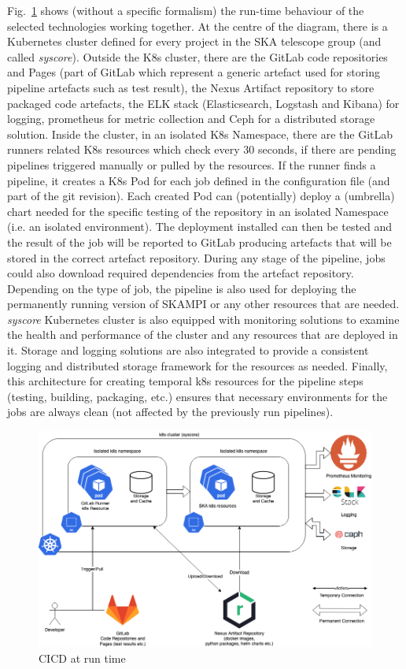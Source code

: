 \documentclass[a4paper]{spie}  %
\begin{document}
Fig.~\ref{fig:cicdruntime} shows (without a specific formalism) the run-time behaviour of the selected technologies working together. At the centre of the diagram, there is a Kubernetes cluster defined for every project in the SKA telescope group (and called \textit{syscore}). Outside the K8s cluster, there are the GitLab code repositories and Pages\cite{gitlab} (part of GitLab which represent a generic artefact used for storing pipeline artefacts such as test result), the Nexus Artifact repository\cite{nexus} to store packaged code artefacts, the ELK stack (Elasticsearch, Logstash and Kibana)\cite{elastcsearch} for logging, prometheus\cite{prometheus} for metric collection and Ceph\cite{ceph} for a distributed storage solution.
Inside the cluster, in an isolated K8s Namespace, there are the GitLab runners related K8s resources which check every 30 seconds, if there are pending pipelines triggered manually or pulled by the resources. If the runner finds a pipeline, it creates a K8s Pod for each job defined in the configuration file (and part of the git revision). Each created Pod can (potentially) deploy a (umbrella) chart needed for the specific testing of the repository in an isolated Namespace (i.e. an isolated environment). The deployment installed can then be tested and the result of the job will be reported to GitLab producing artefacts that will be stored in the correct artefact repository. During any stage of the pipeline, jobs could also download required dependencies from the artefact repository. Depending on the type of job, the pipeline is also used for deploying the permanently running version of SKAMPI or any other resources that are needed. \textit{syscore} Kubernetes cluster is also equipped with monitoring solutions to examine the health and performance of the cluster and any resources that are deployed in it. Storage and logging solutions are also integrated to provide a consistent logging and distributed storage framework for the resources as needed. Finally, this architecture for creating temporal k8s resources for the pipeline steps (testing, building, packaging, etc.) ensures that necessary environments for the jobs are always clean (not affected by the previously run pipelines).

\begin{figure}[!htb]
   \centering
   \includegraphics*[width=0.8\columnwidth]{cicdruntime-v2}
   \caption{CICD at run time}
   \label{fig:cicdruntime}
\end{figure}
\end{document}
